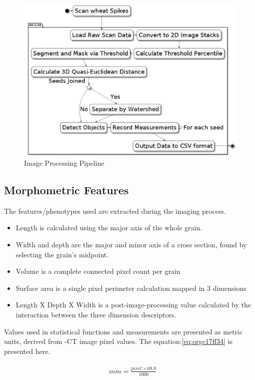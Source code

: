 \documentclass[11pt]{report}
\begin{document}
\begin{figure}[htbp]
\centering
\includegraphics[width=15cm]{./images/matlab.png}
\caption{\label{fig:org00c86e5}
Image Processing Pipeline}
\end{figure}

\subsection{Morphometric Features}
\label{sec:orgdb76a91}

The features/phenotypes used are extracted during the imaging process.
\begin{itemize}
\item Length is calculated using the major axis of the whole grain.
\item Width and depth are the major and minor axis of a cross section, found by selecting the grain's midpoint.
\item Volume is a complete connected pixel count per grain
\item Surface area is a single pixel perimeter calculation mapped in 3 dimensions
\item Length X Depth X Width is a post-image-processing value calculated by the interaction between the three dimension descriptors.
\end{itemize}

Values used in statistical functions and measurements are presented as metric units, derived from \textmu{}-CT image pixel values. The equation:\ref{eq:orge17ff34} is presented here.

\begin{align}
\label{eq:orge17ff34}
  &\begin{aligned}
mm = \frac{pixel \times 68.8}{1000}
  \end{aligned}
\end{align}
\end{document}
